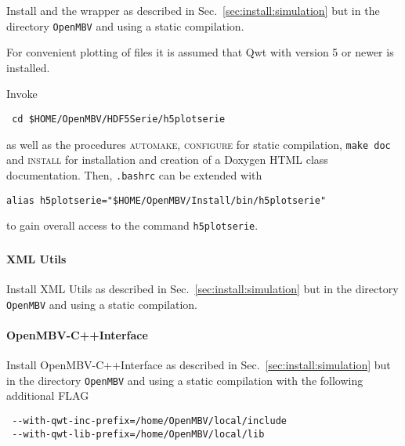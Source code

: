 \subsubsection{\HDF}
Install \HDF{} and the \HDF{} wrapper as described in Sec.~\ref{sec:install:simulation} but in the directory \texttt{OpenMBV} and using a static compilation.\par
For convenient plotting of \HDF{} files it is assumed that Qwt with version 5 or newer is installed.\par
Invoke 
\begin{verbatim}
 cd $HOME/OpenMBV/HDF5Serie/h5plotserie
\end{verbatim}
as well as the procedures \textsc{automake, configure} for static compilation, \texttt{make doc} and \textsc{install} for installation and creation of a Doxygen HTML class documentation. Then, \texttt{.bashrc} can be extended with
\begin{verbatim}
alias h5plotserie="$HOME/OpenMBV/Install/bin/h5plotserie"
\end{verbatim}
to gain overall access to the command \texttt{h5plotserie}.

\subsubsection{\OpenMBV{}}
\paragraph{XML Utils}
Install XML Utils as described in Sec.~\ref{sec:install:simulation} but in the directory \texttt{OpenMBV} and using a static compilation.

\paragraph{OpenMBV-C++Interface}
Install OpenMBV-C++Interface as described in Sec.~\ref{sec:install:simulation} but in the directory \texttt{OpenMBV} and using a static compilation with the following additional FLAG
\begin{verbatim}
 --with-qwt-inc-prefix=/home/OpenMBV/local/include 
 --with-qwt-lib-prefix=/home/OpenMBV/local/lib
\end{verbatim}

